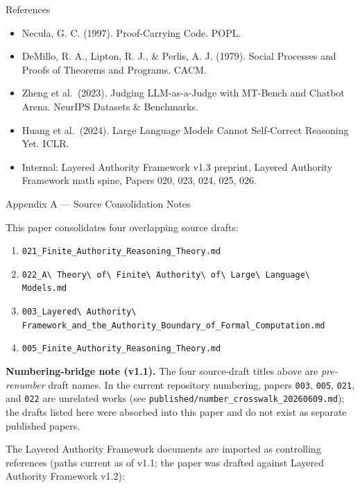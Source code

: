 \documentclass[
  10pt,
]{article}
\providecommand{\tightlist}{%
  \setlength{\itemsep}{0pt}\setlength{\parskip}{0pt}}
\providecommand{\tightlist}{%
  \setlength{\itemsep}{0pt}\setlength{\parskip}{0pt}}
\DeclareRobustCommand{\texttt}[1]{{\paperSymbolFont\nolinkurl{#1}}}
\begin{document}
References

\begin{itemize}
\tightlist
\item
  Necula, G. C. (1997). Proof-Carrying Code. POPL.
\item
  DeMillo, R. A., Lipton, R. J., \& Perlis, A. J. (1979). Social Processes and Proofs of Theorems and Programs. CACM.
\item
  Zheng et al.~(2023). Judging LLM-as-a-Judge with MT-Bench and Chatbot Arena. NeurIPS Datasets \& Benchmarks.
\item
  Huang et al.~(2024). Large Language Models Cannot Self-Correct Reasoning Yet. ICLR.
\item
  Internal: Layered Authority Framework v1.3 preprint, Layered Authority Framework math spine, Papers 020, 023, 024, 025, 026.
\end{itemize}

Appendix A --- Source Consolidation Notes

This paper consolidates four overlapping source drafts:

\begin{enumerate}
\def\labelenumi{\arabic{enumi}.}
\tightlist
\item
  \texttt{021\_Finite\_Authority\_Reasoning\_Theory.md}
\item
  \texttt{022\_A\ Theory\ of\ Finite\ Authority\ of\ Large\ Language\ Models.md}
\item
  \texttt{003\_Layered\ Authority\ Framework\_and\_the\_Authority\_Boundary\_of\_Formal\_Computation.md}
\item
  \texttt{005\_Finite\_Authority\_Reasoning\_Theory.md}
\end{enumerate}

\textbf{Numbering-bridge note (v1.1).} The four source-draft titles above are \emph{pre-renumber} draft names. In the current repository numbering, papers \texttt{003}, \texttt{005}, \texttt{021}, and \texttt{022} are unrelated works (see \texttt{published/number\_crosswalk\_20260609.md}); the drafts listed here were absorbed into this paper and do not exist as separate published papers.

The Layered Authority Framework documents are imported as controlling references (paths current as of v1.1; the paper was drafted against Layered Authority Framework v1.2):
\end{document}
